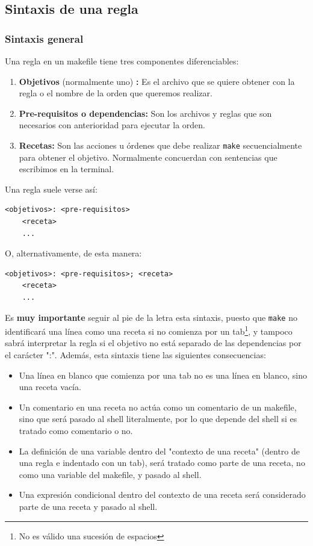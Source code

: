 \documentclass[11pt,twoside,titlepage,a4paper]{article}
\theoremstyle{definition}
\theoremstyle{plain_rojo}
\theoremstyle{remark}
\begin{document}
\subsection{Sintaxis de una regla}

\subsubsection{Sintaxis general}

Una regla en un makefile tiene tres componentes diferenciables:

\begin{enumerate}[font={\color{rojooscuro}\bfseries}]
	\item \textcolor{rojooscuro}{\textbf{Objetivos} (normalmente uno)
	\textbf{:}} Es el archivo que se quiere obtener con la regla o el nombre 
	de la orden que queremos realizar.
	\item \textcolor{rojooscuro}{\textbf{Pre-requisitos o dependencias:}} Son 
	los archivos y reglas que son necesarios con anterioridad para ejecutar 
	la orden.
	\item \textcolor{rojooscuro}{\textbf{Recetas:}} Son las acciones u órdenes
	que debe realizar \texttt{make} secuencialmente para obtener el objetivo. 
	Normalmente concuerdan con sentencias que escribimos en la terminal.
\end{enumerate}
\newpage
Una regla suele verse así:
\bigskip
\begin{lstlisting}
<objetivos>: <pre-requisitos>
	<receta>
	...
\end{lstlisting}
\bigskip
O, alternativamente, de esta manera:
\bigskip
\begin{lstlisting}
<objetivos>: <pre-requisitos>; <receta>
	<receta>
	...
\end{lstlisting}
\bigskip
Es \textbf{muy importante} seguir al pie de la letra esta sintaxis, puesto
que \texttt{make} no identificará una línea como una receta si no comienza 
por un tab\footnote{No es válido una sucesión de espacios}, y tampoco sabrá 
interpretar la regla si el objetivo no está separado de las dependencias por 
el carácter ":". Además, esta sintaxis tiene las siguientes consecuencias:

\begin{itemize}[font={\color{rojooscuro}\bfseries}]
	\item Una línea en blanco que comienza por una tab no es una línea en 
	blanco, sino una receta vacía.
	\item Un comentario en una receta no actúa como un comentario de un 
	makefile, sino que será pasado al shell literalmente, por lo que depende 
	del shell si es tratado como comentario o no.
	\item La definición de una variable dentro del "contexto de una
	receta" (dentro de una regla e indentado con un tab), será tratado como 
	parte de una receta, no como una variable del makefile, y pasado al shell.
	\item Una expresión condicional dentro del contexto de una receta será 
	considerado parte de una receta y pasado al shell. 
\end{itemize}
\end{document}
